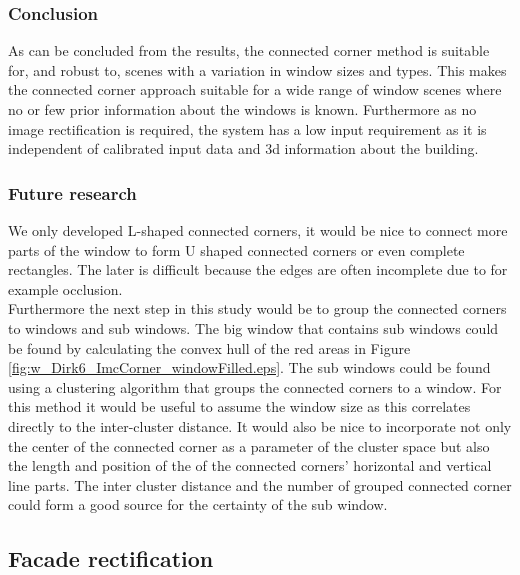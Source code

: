 \subsubsection{Conclusion}
As can be concluded from the results, the connected corner method is suitable
for, and robust to, scenes with a variation in window sizes and types. This
	makes the connected corner approach suitable for a wide range of window
	scenes where no or few prior information about the windows is known.
	Furthermore as no image rectification is required, the system has a low input
	requirement as it is independent of calibrated input data and 3d information
	about the building.

\subsubsection{Future research} %
We only developed L-shaped connected corners, it would be nice to connect more
parts of the window to form U shaped connected corners or even complete rectangles.
The later is difficult because the edges are often incomplete due to for example occlusion.\\

Furthermore the next step in this study would be to group the connected corners
to windows and sub windows.  The big window that contains sub windows could be
found by calculating the convex hull of the red areas in Figure
\ref{fig:w_Dirk6_ImcCorner_windowFilled.eps}.  The sub windows could be found
using a clustering algorithm that groups the connected corners to a window. For
this method it would be useful to assume the window size as this correlates
directly to the inter-cluster distance.  It would also be nice to incorporate
not only the center of the connected corner as a parameter of the cluster space
but also the length and position of the of the connected corners' horizontal
and vertical line parts.  The inter cluster distance and the number of grouped
connected corner could form a good source for the certainty of the sub
window.\\







\subsection{Facade rectification}
